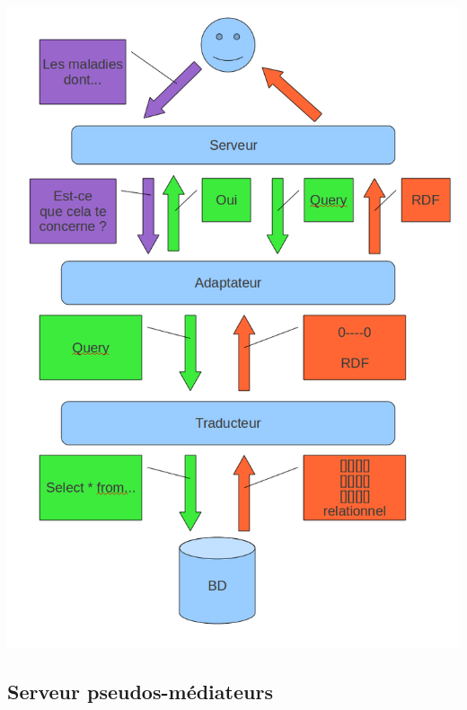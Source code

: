 \documentclass[12pt]{article}
\begin{document}
\begin{center}
	\includegraphics[scale=0.50]{images/selectQuerySysteme.png}
\end{center}

\subsection{Serveur pseudos-médiateurs}
\end{document}

